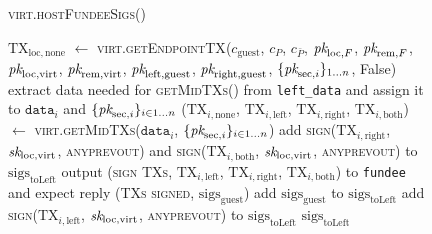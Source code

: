 \begin{figure}[H]
  \begin{processbox}{\textsc{virt.hostFundeeSigs}()}
    \begin{algorithmic}[1]
      \State $\mathrm{TX}_{\mathrm{loc}, \mathrm{none}}$ $\gets$
      \textsc{virt.getEndpointTX}($c_{\mathrm{guest}}$, $c_P$, $c_{\bar{P}}$,
      $\textit{pk}_{\mathrm{loc}, F}$, $\textit{pk}_{\mathrm{rem}, F}$, $\textit{pk}_{\mathrm{loc},
      \mathrm{virt}}$, $\textit{pk}_{\mathrm{rem}, \mathrm{virt}}$,
      $\textit{pk}_{\mathrm{left}, \mathrm{guest}}$, $\textit{pk}_{\mathrm{right},
      \mathrm{guest}}$, $\{\textit{pk}_{\mathrm{sec}, i}\}_{1 \dots n}$, False)
      \label{code:virtual-layer:fundee-sigs:tx-none}
        \State extract data needed for \textsc{getMidTXs}() from
        \texttt{left\_data} and assign it to $\texttt{data}_i$ and
        $\{\textit{pk}_{\mathrm{sec}, i}\}_{i \in 1 \dots n}$
        \State ($\mathrm{TX}_{i, \mathrm{none}}$, $\mathrm{TX}_{i,
        \mathrm{left}}$, $\mathrm{TX}_{i, \mathrm{right}}$, $\mathrm{TX}_{i,
        \mathrm{both}}$) $\gets$ \textsc{virt.getMidTXs}($\texttt{data}_i$,
        $\{\textit{pk}_{\mathrm{sec}, i}\}_{i \in 1 \dots n}$)
        \State add \textsc{sign}($\mathrm{TX}_{i, \mathrm{right}}$,
        $\textit{sk}_{\mathrm{loc}, \mathrm{virt}}$, \textsc{anyprevout}) and
        \textsc{sign}($\mathrm{TX}_{i, \mathrm{both}}$, $\textit{sk}_{\mathrm{loc},
        \mathrm{virt}}$, \textsc{anyprevout}) to
        $\mathrm{sigs}_{\mathrm{toLeft}}$ 
        \State output (\textsc{sign TXs}, $\mathrm{TX}_{i, \mathrm{left}}$,
        $\mathrm{TX}_{i, \mathrm{right}}$, $\mathrm{TX}_{i, \mathrm{both}}$)
        to \texttt{fundee} and expect reply (\textsc{TXs signed},
        $\mathrm{sigs}_{\mathrm{guest}}$)
        \State add $\mathrm{sigs}_{\mathrm{guest}}$ to
        $\mathrm{sigs}_{\mathrm{toLeft}}$
         
          \State add \textsc{sign}($\mathrm{TX}_{i, \mathrm{left}}$,
          $\textit{sk}_{\mathrm{loc}, \mathrm{virt}}$, \textsc{anyprevout}) to
          $\mathrm{sigs}_{\mathrm{toLeft}}$
        \EndIf
      \EndFor
      \State \Return $\mathrm{sigs}_{\mathrm{toLeft}}$
    \end{algorithmic}
  \end{processbox}
  \caption{}
  \label{code:virtual-layer:fundee-sigs}
\end{figure}

